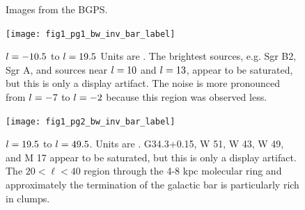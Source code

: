 \clearpage

\begin{figure}
  \caption{Images from the BGPS.}
  \label{fig:BGPSMontage}
  \addtocounter{figure}{-1}
  \renewcommand{\thefigure}{\arabic{figure}\alph{subfig}}  
  \begin{minipage}{6.5in}
    \begin{center}
      \texttt{[image: fig1\_pg1\_bw\_inv\_bar\_label]}
      \caption{$l=-10.5$ to $l=19.5$ Units are \jyb.  The
      brightest sources, e.g. Sgr B2, Sgr A, and sources near
      $l=10$ and $l=13$, appear to be saturated, but this is
      only a display artifact.  The noise is more pronounced from
      $l=-7$ to $l=-2$ because this region was observed less.}
    \end{center}
  \end{minipage}
\end{figure}

\addtocounter{figure}{-1}
\addtocounter{subfig}{1}

\begin{figure}
  \begin{minipage}{6.5in} 
    \begin{center}
      \texttt{[image: fig1\_pg2\_bw\_inv\_bar\_label]} 
      \caption{$l=19.5$ to $l=49.5$.  Units are \jyb .
	G34.3+0.15, W 51, W 43, W 49, and M 17 appear to be saturated,
	but this is only a display artifact.  The $20 < \ell < 40$
	region through the 4-8 kpc molecular ring and approximately
	the termination of the galactic bar is particularly rich in
	clumps.}
    \end{center}
  \end{minipage}
\end{figure}

\addtocounter{figure}{-1}
\addtocounter{subfig}{1}

